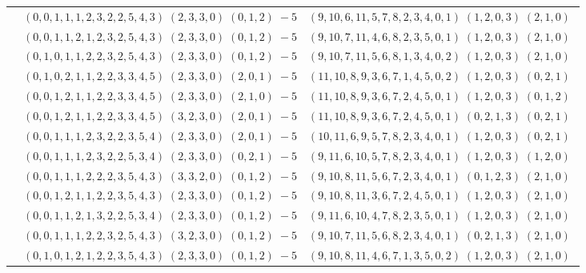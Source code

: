 \documentclass[11pt]{article}
\begin{document}
\begin{longtable}[l]{|c|c|c|}
 \cline{2-3} 
 & $(0 ,0 ,1 ,1 ,1 ,2 ,3 ,2 ,2 ,5 ,4 ,3) \;(2 ,3 ,3 ,0) \;(0 ,1 ,2) \;-5$ & $(9 ,10 ,6 ,11 ,5 ,7 ,8 ,2 ,3 ,4 ,0 ,1) \;(1 ,2 ,0 ,3) \;(2 ,1 ,0) \;$\\ 
 \cline{2-3} 
 & $(0 ,0 ,1 ,1 ,2 ,1 ,2 ,3 ,2 ,5 ,4 ,3) \;(2 ,3 ,3 ,0) \;(0 ,1 ,2) \;-5$ & $(9 ,10 ,7 ,11 ,4 ,6 ,8 ,2 ,3 ,5 ,0 ,1) \;(1 ,2 ,0 ,3) \;(2 ,1 ,0) \;$\\ 
 \cline{2-3} 
 & $(0 ,1 ,0 ,1 ,1 ,2 ,2 ,3 ,2 ,5 ,4 ,3) \;(2 ,3 ,3 ,0) \;(0 ,1 ,2) \;-5$ & $(9 ,10 ,7 ,11 ,5 ,6 ,8 ,1 ,3 ,4 ,0 ,2) \;(1 ,2 ,0 ,3) \;(2 ,1 ,0) \;$\\ 
 \cline{2-3} 
 & $(0 ,1 ,0 ,2 ,1 ,1 ,2 ,2 ,3 ,3 ,4 ,5) \;(2 ,3 ,3 ,0) \;(2 ,0 ,1) \;-5$ & $(11 ,10 ,8 ,9 ,3 ,6 ,7 ,1 ,4 ,5 ,0 ,2) \;(1 ,2 ,0 ,3) \;(0 ,2 ,1) \;$\\ 
 \cline{2-3} 
 & $(0 ,0 ,1 ,2 ,1 ,1 ,2 ,2 ,3 ,3 ,4 ,5) \;(2 ,3 ,3 ,0) \;(2 ,1 ,0) \;-5$ & $(11 ,10 ,8 ,9 ,3 ,6 ,7 ,2 ,4 ,5 ,0 ,1) \;(1 ,2 ,0 ,3) \;(0 ,1 ,2) \;$\\ 
 \cline{2-3} 
 & $(0 ,0 ,1 ,2 ,1 ,1 ,2 ,2 ,3 ,3 ,4 ,5) \;(3 ,2 ,3 ,0) \;(2 ,0 ,1) \;-5$ & $(11 ,10 ,8 ,9 ,3 ,6 ,7 ,2 ,4 ,5 ,0 ,1) \;(0 ,2 ,1 ,3) \;(0 ,2 ,1) \;$\\ 
 \cline{2-3} 
 & $(0 ,0 ,1 ,1 ,1 ,2 ,3 ,2 ,2 ,3 ,5 ,4) \;(2 ,3 ,3 ,0) \;(2 ,0 ,1) \;-5$ & $(10 ,11 ,6 ,9 ,5 ,7 ,8 ,2 ,3 ,4 ,0 ,1) \;(1 ,2 ,0 ,3) \;(0 ,2 ,1) \;$\\ 
 \cline{2-3} 
 & $(0 ,0 ,1 ,1 ,1 ,2 ,3 ,2 ,2 ,5 ,3 ,4) \;(2 ,3 ,3 ,0) \;(0 ,2 ,1) \;-5$ & $(9 ,11 ,6 ,10 ,5 ,7 ,8 ,2 ,3 ,4 ,0 ,1) \;(1 ,2 ,0 ,3) \;(1 ,2 ,0) \;$\\ 
 \cline{2-3} 
 & $(0 ,0 ,1 ,1 ,1 ,2 ,2 ,2 ,3 ,5 ,4 ,3) \;(3 ,3 ,2 ,0) \;(0 ,1 ,2) \;-5$ & $(9 ,10 ,8 ,11 ,5 ,6 ,7 ,2 ,3 ,4 ,0 ,1) \;(0 ,1 ,2 ,3) \;(2 ,1 ,0) \;$\\ 
 \cline{2-3} 
 & $(0 ,0 ,1 ,2 ,1 ,1 ,2 ,2 ,3 ,5 ,4 ,3) \;(2 ,3 ,3 ,0) \;(0 ,1 ,2) \;-5$ & $(9 ,10 ,8 ,11 ,3 ,6 ,7 ,2 ,4 ,5 ,0 ,1) \;(1 ,2 ,0 ,3) \;(2 ,1 ,0) \;$\\ 
 \cline{2-3} 
 & $(0 ,0 ,1 ,1 ,2 ,1 ,3 ,2 ,2 ,5 ,3 ,4) \;(2 ,3 ,3 ,0) \;(0 ,1 ,2) \;-5$ & $(9 ,11 ,6 ,10 ,4 ,7 ,8 ,2 ,3 ,5 ,0 ,1) \;(1 ,2 ,0 ,3) \;(2 ,1 ,0) \;$\\ 
 \cline{2-3} 
 & $(0 ,0 ,1 ,1 ,1 ,2 ,2 ,3 ,2 ,5 ,4 ,3) \;(3 ,2 ,3 ,0) \;(0 ,1 ,2) \;-5$ & $(9 ,10 ,7 ,11 ,5 ,6 ,8 ,2 ,3 ,4 ,0 ,1) \;(0 ,2 ,1 ,3) \;(2 ,1 ,0) \;$\\ 
 \cline{2-3} 
 & $(0 ,1 ,0 ,1 ,2 ,1 ,2 ,2 ,3 ,5 ,4 ,3) \;(2 ,3 ,3 ,0) \;(0 ,1 ,2) \;-5$ & $(9 ,10 ,8 ,11 ,4 ,6 ,7 ,1 ,3 ,5 ,0 ,2) \;(1 ,2 ,0 ,3) \;(2 ,1 ,0) \;$\\ 

\end{longtable}
\end{document}
